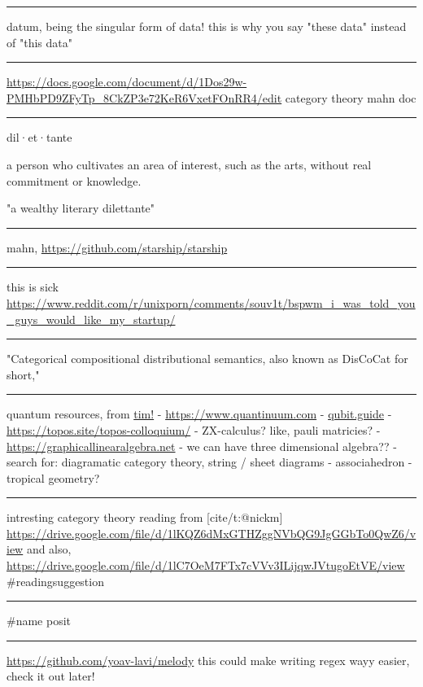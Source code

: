 \documentclass[letterpaper]{article}
\begin{document}
\noindent\rule{\textwidth}{0.5pt}

datum, being the singular form of data! this is why you say "these data"
instead of "this data"

\noindent\rule{\textwidth}{0.5pt}

\url{https://docs.google.com/document/d/1Dos29w-PMHbPD9ZFyTp\_8CkZP3e72KeR6VxetFOnRR4/edit}
category theory mahn doc

\noindent\rule{\textwidth}{0.5pt}

dil·et·tante

a person who cultivates an area of interest, such as the arts, without
real commitment or knowledge.

"a wealthy literary dilettante"

\noindent\rule{\textwidth}{0.5pt}

mahn, \url{https://github.com/starship/starship}

\noindent\rule{\textwidth}{0.5pt}

this is sick
\url{https://www.reddit.com/r/unixporn/comments/souv1t/bspwm\_i\_was\_told\_you\_guys\_would\_like\_my\_startup/}

\noindent\rule{\textwidth}{0.5pt}

"Categorical compositional distributional semantics, also known as
DisCoCat for short,"

\noindent\rule{\textwidth}{0.5pt}

quantum resources, from \href{https://thosgood.com}{tim!} -
\url{https://www.quantinuum.com} - \href{https://qubit.guide}{qubit.guide} -
\url{https://topos.site/topos-colloquium/} - ZX-calculus? like, pauli
matricies? - \url{https://graphicallinearalgebra.net} - we can have three
dimensional algebra?? - search for: diagramatic category theory, string
/ sheet diagrams - associahedron - tropical geometry?

\noindent\rule{\textwidth}{0.5pt}

intresting category theory reading from [cite/t:@nickm]
\url{https://drive.google.com/file/d/1lKQZ6dMxGTHZggNVbQG9JgGGbTo0QwZ6/view}
and also,
\url{https://drive.google.com/file/d/1lC7OeM7FTx7cVVv3ILijqwJVtugoEtVE/view}
\#readingsuggestion

\noindent\rule{\textwidth}{0.5pt}

\#name posit

\noindent\rule{\textwidth}{0.5pt}

\url{https://github.com/yoav-lavi/melody} this could make writing regex wayy
easier, check it out later!
\end{document}
